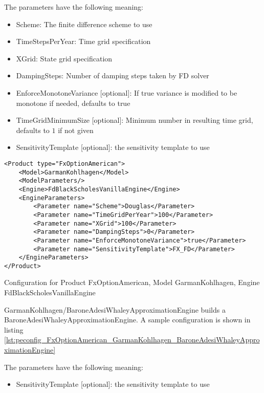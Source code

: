 The parameters have the following meaning:

\begin{itemize}
\item Scheme: The finite difference scheme to use
\item TimeStepsPerYear: Time grid specification
\item XGrid: State grid specification
\item DampingSteps: Number of damping steps taken by FD solver
\item EnforceMonotoneVariance [optional]: If true variance is modified to be monotone if needed, defaults to true
\item TimeGridMinimumSize [optional]: Minimum number in resulting time grid, defaults to $1$ if not given
\item SensitivityTemplate [optional]: the sensitivity template to use 
\end{itemize}

\begin{longlisting}
\begin{verbatim}
<Product type="FxOptionAmerican">
    <Model>GarmanKohlhagen</Model>
    <ModelParameters/>
    <Engine>FdBlackScholesVanillaEngine</Engine>
    <EngineParameters>
        <Parameter name="Scheme">Douglas</Parameter>
        <Parameter name="TimeGridPerYear">100</Parameter>
        <Parameter name="XGrid">100</Parameter>
        <Parameter name="DampingSteps">0</Parameter>
        <Parameter name="EnforceMonotoneVariance">true</Parameter>
        <Parameter name="SensitivityTemplate">FX_FD</Parameter>
    </EngineParameters>
</Product>
\end{verbatim}
\caption{Configuration for Product FxOptionAmerican, Model GarmanKohlhagen, Engine FdBlackScholesVanillaEngine}
\label{lst:peconfig_FxOptionAmerican_GarmanKohlhagen_FdBlackScholesVanillaEngine}
\end{longlisting}

GarmanKohlhagen/BaroneAdesiWhaleyApproximationEngine builds a BaroneAdesiWhaleyApproximationEngine. A sample configuration is shown in listing
\ref{lst:peconfig_FxOptionAmerican_GarmanKohlhagen_BaroneAdesiWhaleyApproximationEngine}

The parameters have the following meaning:

\begin{itemize}
\item SensitivityTemplate [optional]: the sensitivity template to use 
\end{itemize}

